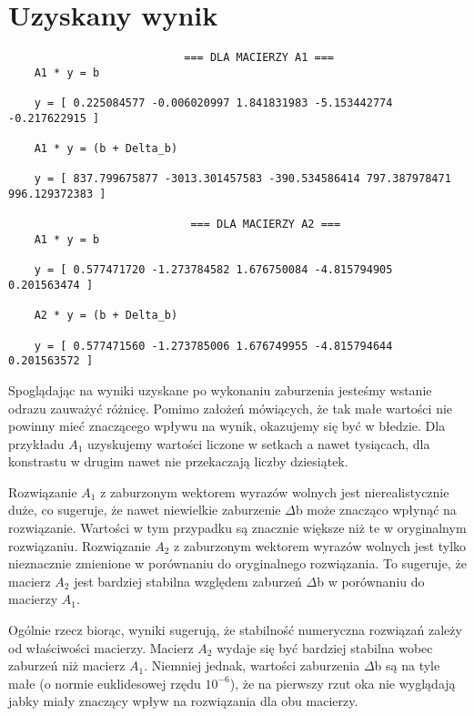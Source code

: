 \documentclass{article}
\begin{document}
  \section{Uzyskany wynik}
  \begin{lstlisting}
                           === DLA MACIERZY A1 ===
    A1 * y = b
    
    y = [ 0.225084577 -0.006020997 1.841831983 -5.153442774 -0.217622915 ]
    
    A1 * y = (b + Delta_b)
    
    y = [ 837.799675877 -3013.301457583 -390.534586414 797.387978471 996.129372383 ]
    
                            === DLA MACIERZY A2 ===
    A1 * y = b
    
    y = [ 0.577471720 -1.273784582 1.676750084 -4.815794905 0.201563474 ]
    
    A2 * y = (b + Delta_b)
    
    y = [ 0.577471560 -1.273785006 1.676749955 -4.815794644 0.201563572 ]
    \end{lstlisting}
    Spoglądając na wyniki uzyskane po wykonaniu zaburzenia jesteśmy wstanie odrazu zauważyć
    różnicę. Pomimo założeń mówiących, że tak małe wartości nie powinny mieć znaczącego wpływu
    na wynik, okazujemy się być w błedzie. Dla przykładu $A_1$ uzyskujemy wartości liczone w setkach
    a nawet tysiącach, dla konstrastu w drugim nawet nie przekaczają liczby dziesiątek.

    Rozwiązanie $A_1$ z zaburzonym wektorem wyrazów wolnych jest nierealistycznie duże, 
    co sugeruje, że nawet niewielkie zaburzenie $\Delta$b może znacząco wpłynąć na rozwiązanie. 
    Wartości w tym przypadku są znacznie większe niż te w oryginalnym rozwiązaniu.
    Rozwiązanie $A_2$ z zaburzonym wektorem wyrazów wolnych jest tylko nieznacznie zmienione w 
    porównaniu do oryginalnego rozwiązania. To sugeruje, że macierz $A_2$ jest bardziej 
    stabilna względem zaburzeń $\Delta$b w porównaniu do macierzy $A_1$.
  
    Ogólnie rzecz biorąc, wyniki sugerują, że stabilność numeryczna rozwiązań zależy od 
    właściwości macierzy. Macierz $A_2$ wydaje się być bardziej stabilna wobec zaburzeń niż macierz $A_1$. 
    Niemniej jednak, wartości zaburzenia $\Delta$b są na tyle małe (o normie euklidesowej rzędu $10^{-6}$), 
    że na pierwszy rzut oka nie wyglądają jabky miały znaczący wpływ na rozwiązania dla obu macierzy. 
\end{document}
